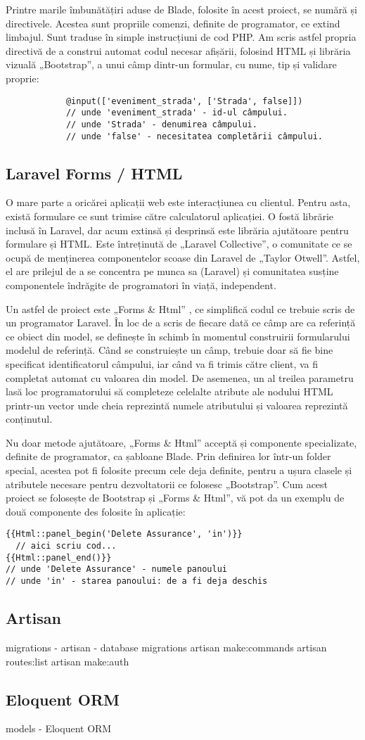 		Printre marile îmbunătățiri aduse de Blade, folosite în acest proiect, se numără și directivele.
		Acestea sunt propriile comenzi, definite de programator, ce extind limbajul.
		Sunt traduse în simple instrucțiuni de cod PHP.
		Am scris astfel propria directivă de a construi automat codul necesar afișării, folosind HTML și librăria vizuală „Bootstrap”, a unui câmp dintr-un formular, cu nume, tip și validare proprie:
		\begin{verbatim}
			@input(['eveniment_strada', ['Strada', false]])
			// unde 'eveniment_strada' - id-ul câmpului.
			// unde 'Strada' - denumirea câmpului.
			// unde 'false' - necesitatea completării câmpului.
		\end{verbatim}

	\subsection{Laravel Forms / HTML}

		O mare parte a oricărei aplicații web este interacțiunea cu clientul.
		Pentru asta, există formulare ce sunt trimise către calculatorul aplicației.
		O fostă librărie inclusă în Laravel, dar acum extinsă și desprinsă este librăria ajutătoare pentru formulare și HTML.
		Este întreținută de „Laravel Collective”, o comunitate ce se ocupă de menținerea componentelor scoase din Laravel de „Taylor Otwell”.
		Astfel, el are prilejul de a se concentra pe munca sa (Laravel) și comunitatea susține componentele îndrăgite de programatori în viață, independent.\cite{laravel_collective_about}

		Un astfel de proiect este „Forms \& Html” \cite{laravel_collective_forms}, ce simplifică codul ce trebuie scris de un programator Laravel.
		În loc de a scris de fiecare dată ce câmp are ca referință ce obiect din model, se definește în schimb în momentul construirii formularului modelul de referință.
		Când se construiește un câmp, trebuie doar să fie bine specificat identificatorul câmpului, iar când va fi trimis către client, va fi completat automat cu valoarea din model.
		De asemenea, un al treilea parametru lasă loc programatorului să completeze celelalte atribute ale nodului HTML printr-un vector unde cheia reprezintă numele atributului și valoarea reprezintă conținutul.

		Nu doar metode ajutătoare, „Forms \& Html” acceptă și componente specializate, definite de programator, ca șabloane Blade.
		Prin definirea lor într-un folder special, acestea pot fi folosite precum cele deja definite, pentru a ușura clasele și atributele necesare pentru dezvoltatorii ce folosesc „Bootstrap”.
		Cum acest proiect se folosește de Bootstrap și „Forms \& Html”, vă pot da un exemplu de două componente des folosite în aplicație:
		\begin{Verbatim}
{{Html::panel_begin('Delete Assurance', 'in')}}
  // aici scriu cod...
{{Html::panel_end()}}
// unde 'Delete Assurance' - numele panoului
// unde 'in' - starea panoului: de a fi deja deschis
		\end{Verbatim}

	\subsection{Artisan}
		migrations - artisan - database migrations
		artisan make:commands
		artisan routes:list
		artisan make:auth
	\subsection{Eloquent ORM}
		models - Eloquent ORM
